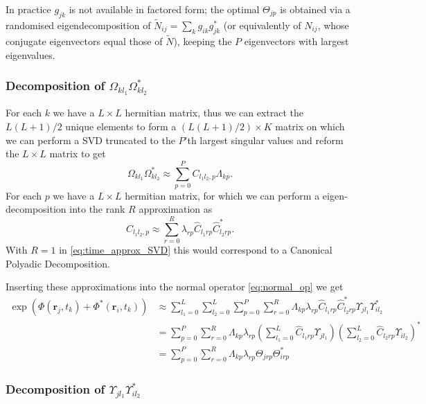 \documentclass{article}
\begin{document}
In practice $g_{jk}$ is not available in factored form; the optimal $\Theta_{jp}$
is obtained via a randomised eigendecomposition of $\tilde{N}_{ij} = \sum_k g_{ik}g^*_{jk}$
(or equivalently of $N_{ij}$, whose conjugate eigenvectors equal those of $\tilde{N}$),
keeping the $P$ eigenvectors with largest eigenvalues.

\subsubsection{Decomposition of $\Omega_{kl_1} \Omega^*_{kl_2}$}

For each $k$ we have a $L\times L$ hermitian matrix, thus we can extract the $L(L+1)/2$ unique elements to form a $(L(L+1)/2) \times K$ matrix on which
we can perform a SVD truncated to the $P$'th largest singular values and reform the $L \times L$ matrix to get
\begin{equation}
    \Omega_{kl_1} \Omega^*_{kl_2} \approx \sum_{p=0}^P C_{l_1l_2,p} \Lambda_{kp}. \label{eq:time_approx_SVD}
\end{equation}
For each $p$ we have a $L \times L$ hermitian matrix, for which we can perform a eigen-decomposition 
into the rank $R$ approximation as
\begin{equation}
    C_{l_1l_2,p} \approx \sum_{r=0}^R \lambda_{rp} \hat{C}_{l_1rp} \hat{C}^*_{l_2rp}.
\end{equation}
With $R = 1$ in \eqref{eq:time_approx_SVD} this would correspond to a Canonical Polyadic Decomposition.

Inserting these approximations into the normal operator \eqref{eq:normal_op} we get
\begin{align}
    \exp(\Phi(\mathbf{r}_j, t_k) + \Phi^*(\mathbf{r}_i, t_k)) 
        &\approx \sum_{l_1=0}^L \sum_{l_2=0}^L \sum_{p=0}^P \sum_{r=0}^R \Lambda_{kp} \lambda_{rp} \hat{C}_{l_1rp} \hat{C}^*_{l_2rp} \Upsilon_{jl_1} \Upsilon^*_{il_2} \\
        &= \sum_{p=0}^P \sum_{r=0}^R \Lambda_{kp} \lambda_{rp} \left(\sum_{l_1=0}^L \hat{C}_{l_1rp} \Upsilon_{jl_1}\right) \left(\sum_{l_2=0}^L \hat{C}_{l_2rp} \Upsilon_{il_2}\right)^* \\
        &= \sum_{p=0}^P \sum_{r=0}^R \Lambda_{kp} \lambda_{rp} \Theta_{jrp} \Theta^*_{irp} \label{eq:final_approx_normal_op}
\end{align}

\subsubsection{Decomposition of $\Upsilon_{jl_1}\Upsilon^*_{il_2}$}
\end{document}
